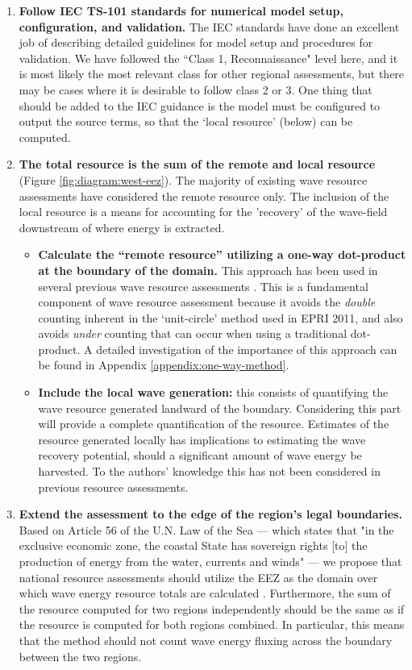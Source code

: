 \begin{enumerate}
\item {\bf Follow IEC TS-101 standards for numerical model setup, configuration, and validation.} The IEC standards have done an excellent job of describing detailed guidelines for model setup and procedures for validation. We have followed the ``Class 1, Reconnaissance" level here, and it is most likely the most relevant class for other regional assessments, but there may be cases where it is desirable to follow class 2 or 3. One thing that should be added to the IEC guidance is the model must be configured to output the source terms, so that the `local resource' (below) can be computed.
\item {\bf The total resource is the sum of the remote and local resource} (Figure \ref{fig:diagram:west-eez}). The majority of existing wave resource assessments have considered the remote resource only. The inclusion of the local resource is a means for accounting for the 'recovery' of the wave-field downstream of where energy is extracted.
\begin{itemize}
    \item {\bf Calculate the ``remote resource'' utilizing a one-way dot-product at the boundary of the domain.} This approach has been used in several previous wave resource assessments \citep{gunnQuantifyingGlobalWave2012, hemerRevisedAssessmentAustralia2017}. This is a fundamental component of wave resource assessment because it avoids the {\em double} counting inherent in the `unit-circle' method used in EPRI 2011, and also avoids {\em under} counting that can occur when using a traditional dot-product. A detailed investigation of the importance of this approach can be found in Appendix \ref{appendix:one-way-method}.
    \item {\bf Include the local wave generation:} this consists of quantifying the wave resource generated landward of the boundary. Considering this part will provide a complete quantification of the resource. Estimates of the resource generated locally has implications to estimating the wave recovery potential, should a significant amount of wave energy be harvested. To the authors' knowledge this has not been considered in previous resource assessments.
\end{itemize}
\item {\bf Extend the assessment to the edge of the region's legal boundaries.} Based on Article 56 of the U.N. Law of the Sea — which states that "in the exclusive economic zone, the coastal State has sovereign rights [to] the production of energy from the water, currents and winds" — we propose that national resource assessments should utilize the EEZ as the domain over which wave energy resource totals are calculated \citep{unitednationsgeneralassemblyConventionLawSea1982}. Furthermore, the sum of the resource computed for two regions independently should be the same as if the resource is computed for both regions combined. In particular, this means that the method should not count wave energy fluxing across the boundary between the two regions.
\end{enumerate}

